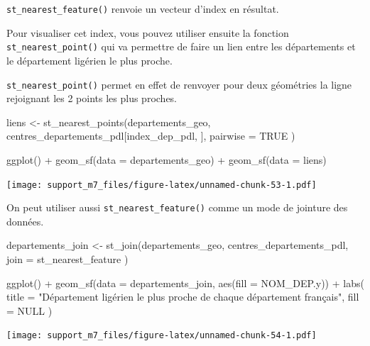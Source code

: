\documentclass[
]{book}
\newenvironment{Shaded}{\begin{snugshade}}{\end{snugshade}}
\newcommand{\AttributeTok}[1]{\textcolor[rgb]{0.77,0.63,0.00}{#1}}
\newcommand{\ConstantTok}[1]{\textcolor[rgb]{0.00,0.00,0.00}{#1}}
\newcommand{\FunctionTok}[1]{\textcolor[rgb]{0.00,0.00,0.00}{#1}}
\newcommand{\NormalTok}[1]{#1}
\newcommand{\OtherTok}[1]{\textcolor[rgb]{0.56,0.35,0.01}{#1}}
\newcommand{\SpecialCharTok}[1]{\textcolor[rgb]{0.00,0.00,0.00}{#1}}
\newcommand{\StringTok}[1]{\textcolor[rgb]{0.31,0.60,0.02}{#1}}
\begin{document}
\texttt{st\_nearest\_feature()} renvoie un vecteur d'index en résultat.

Pour visualiser cet index, vous pouvez utiliser ensuite la fonction \texttt{st\_nearest\_point()} qui va permettre de faire un lien entre les départements et le département ligérien le plus proche.

\texttt{st\_nearest\_point()} permet en effet de renvoyer pour deux géométries la ligne rejoignant les 2 points les plus proches.

\begin{Shaded}
\begin{Highlighting}[]
\NormalTok{liens }\OtherTok{\textless{}{-}} \FunctionTok{st\_nearest\_points}\NormalTok{(departements\_geo,}
\NormalTok{  centres\_departements\_pdl[index\_dep\_pdl, ],}
  \AttributeTok{pairwise =} \ConstantTok{TRUE}
\NormalTok{)}

\FunctionTok{ggplot}\NormalTok{() }\SpecialCharTok{+}
  \FunctionTok{geom\_sf}\NormalTok{(}\AttributeTok{data =}\NormalTok{ departements\_geo) }\SpecialCharTok{+}
  \FunctionTok{geom\_sf}\NormalTok{(}\AttributeTok{data =}\NormalTok{ liens)}
\end{Highlighting}
\end{Shaded}

\texttt{[image: support\_m7\_files/figure-latex/unnamed-chunk-53-1.pdf]}

On peut utiliser aussi \texttt{st\_nearest\_feature()} comme un mode de jointure des données.

\begin{Shaded}
\begin{Highlighting}[]
\NormalTok{departements\_join }\OtherTok{\textless{}{-}} \FunctionTok{st\_join}\NormalTok{(departements\_geo,}
\NormalTok{  centres\_departements\_pdl,}
  \AttributeTok{join =}\NormalTok{ st\_nearest\_feature}
\NormalTok{)}

\FunctionTok{ggplot}\NormalTok{() }\SpecialCharTok{+}
  \FunctionTok{geom\_sf}\NormalTok{(}\AttributeTok{data =}\NormalTok{ departements\_join, }\FunctionTok{aes}\NormalTok{(}\AttributeTok{fill =}\NormalTok{ NOM\_DEP.y)) }\SpecialCharTok{+}
  \FunctionTok{labs}\NormalTok{(}
    \AttributeTok{title =} \StringTok{"Département ligérien le plus proche de chaque département français"}\NormalTok{,}
    \AttributeTok{fill =} \ConstantTok{NULL}
\NormalTok{  )}
\end{Highlighting}
\end{Shaded}

\texttt{[image: support\_m7\_files/figure-latex/unnamed-chunk-54-1.pdf]}
\end{document}
